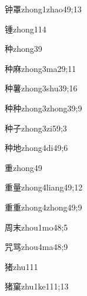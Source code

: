 \begin{verbete}{钟罩}{zhong1zhao4}{9;13}
\end{verbete}
\begin{verbete}{锺}{zhong1}{14}
\end{verbete}
\begin{verbete}{种}{zhong3}{9}
\end{verbete}
\begin{verbete}{种麻}{zhong3ma2}{9;11}
\end{verbete}
\begin{verbete}{种薯}{zhong3shu3}{9;16}
\end{verbete}
\begin{verbete}{种种}{zhong3zhong3}{9;9}
\end{verbete}
\begin{verbete}{种子}{zhong3zi5}{9;3}
\end{verbete}
\begin{verbete}{种地}{zhong4di4}{9;6}
\end{verbete}
\begin{verbete}{重}{zhong4}{9}
\end{verbete}
\begin{verbete}{重量}{zhong4liang4}{9;12}
\end{verbete}
\begin{verbete}{重重}{zhong4zhong4}{9;9}
\end{verbete}
\begin{verbete}{周末}{zhou1mo4}{8;5}
\end{verbete}
\begin{verbete}{咒骂}{zhou4ma4}{8;9}
\end{verbete}
\begin{verbete}{猪}{zhu1}{11}
\end{verbete}
\begin{verbete}{猪窠}{zhu1ke1}{11;13}
\end{verbete}
